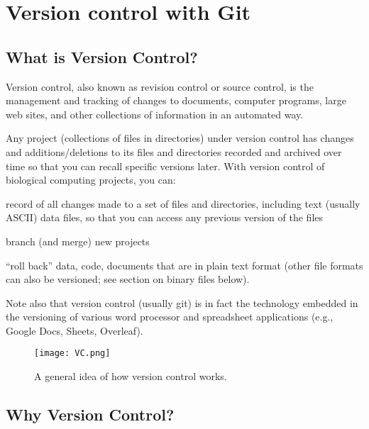 \chapter{Version control with Git}
\label{chap:git}


\section{What is Version Control?}

Version control, also known as revision control or source control, is 
the management and tracking of changes to documents, computer programs, 
large web sites, and other collections of information in an automated 
way.

Any project (collections of files in directories) under version control 
has changes and additions/deletions to its files and directories 
recorded and archived over time so that you can recall specific 
versions later. With version control of biological computing projects, 
you can:

 \begin{compactitem}\itemsep10pt{}
 
		\item record of all changes made to a set of files and directories, 
		including text (usually ASCII) data files, so that you can access 
		any previous version of the files

    \item branch (and merge) new projects

		\item ``roll back'' data, code, documents that are in plain text 
		format (other file formats can also be versioned; see section on 
		binary files below). 
	
	\end{compactitem}
 
Note also that version control (usually git) is in fact the technology 
embedded in the versioning of various word processor and  
spreadsheet applications (e.g., Google Docs, Sheets, Overleaf). 

\begin{figure} \centering
  \texttt{[image: VC.png]}
  \caption{A general idea of how version control works.}
\end{figure}

\section{Why Version Control?}

